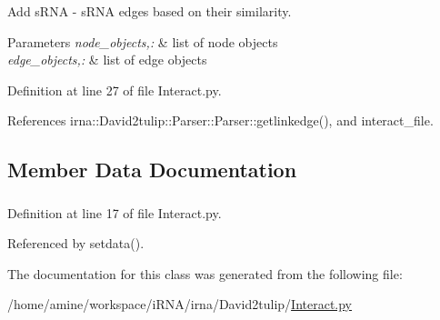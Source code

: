 \-Add s\-R\-N\-A -\/ s\-R\-N\-A edges based on their similarity. 


\begin{DoxyParams}{\-Parameters}
{\em node\-\_\-objects,\-:} & list of node objects \\
\hline
{\em edge\-\_\-objects,\-:} & list of edge objects \\
\hline
\end{DoxyParams}


\-Definition at line 27 of file \-Interact.\-py.



\-References irna\-::\-David2tulip\-::\-Parser\-::\-Parser\-::getlinkedge(), and interact\-\_\-file.



\subsection{\-Member \-Data \-Documentation}
\hypertarget{classirna_1_1David2tulip_1_1Interact_1_1Interact_ad64c3b05ee0087ffc17515c2dc34d95a}{
\subsubsection[{interact\-\_\-file}]{}}
\label{classirna_1_1David2tulip_1_1Interact_1_1Interact_ad64c3b05ee0087ffc17515c2dc34d95a}


\-Definition at line 17 of file \-Interact.\-py.



\-Referenced by setdata().



\-The documentation for this class was generated from the following file\-:\begin{DoxyCompactItemize}
\item 
/home/amine/workspace/i\-R\-N\-A/irna/\-David2tulip/\hyperlink{Interact_8py}{\-Interact.\-py}\end{DoxyCompactItemize}
